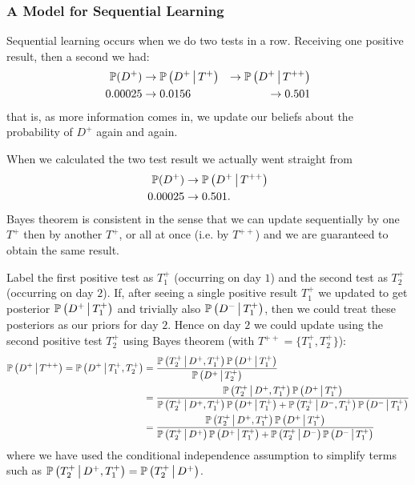 \documentclass[10pt, a4paper]{article}
\begin{document}
\subsubsection{A Model for Sequential Learning}

Sequential learning occurs when we do two tests in a row.
Receiving one positive result,
then a second we had:
\begin{align*}
    \mathbb{P}(D ^ {+}) &\rightarrow \mathbb{P}\left(D ^ {+} \,\middle|\, T ^ {+}\right) &\rightarrow \mathbb{P}\left(D ^ {+} \,\middle|\, T ^ {++}\right) \\
    0.00025 &\rightarrow 0.0156 &\rightarrow 0.501
\end{align*}
that is,
as more information comes in,
we update our beliefs about the probability of $D ^ {+}$ again and again.

When we calculated the two test result we actually went straight from
\begin{align*}
    \mathbb{P}(D ^ {+}) &\rightarrow \mathbb{P}\left(D ^ {+} \,\middle|\, T ^ {++}\right) \\
    0.00025 &\rightarrow 0.501.
\end{align*}
Bayes theorem is consistent in the sense that we can update sequentially by one $T ^ {+}$ then by another $T ^ {+}$,
or all at once
(i.e. by $T ^ {++}$)
and we are guaranteed to obtain the same result.

\begin{example}
    Label the first positive test as $T_1 ^ {+}$
    (occurring on day $1$)
    and the second test as $T_2 ^ {+}$
    (occurring on day $2$).
    If,
    after seeing a single positive result $T_1 ^ {+}$ we updated to get posterior $\mathbb{P}\left(D ^ {+} \,\middle|\, T_1 ^ {+}\right)$ and trivially also $\mathbb{P}\left(D ^ {-} \,\middle|\, T_1 ^ {+}\right)$,
    then we could treat these posteriors as our priors for day $2$.
    Hence on day $2$ we could update using the second positive test $T_2 ^ {+}$ using Bayes theorem
    (with $T ^ {++} = \{T_1 ^ {+}, T_2 ^ {+}\}$):
    \begin{align*}
        \mathbb{P}\left(D ^ {+} \,\middle|\, T ^ {++}\right) = \mathbb{P}\left(D ^ {+} \,\middle|\, T_1 ^ {+}, T_2 ^ {+}\right) &= \frac{\mathbb{P}\left(T_2 ^ {+} \,\middle|\, D ^ {+}, T_1 ^ {+}\right)\mathbb{P}\left(D ^ {+} \,\middle|\, T_1 ^ {+}\right)}{\mathbb{P}\left(D ^ {+} \,\middle|\, T_2 ^ {+}\right)} \\
        &= \frac{\mathbb{P}\left(T_2 ^ {+} \,\middle|\, D ^ {+}, T_1 ^ {+}\right)\mathbb{P}\left(D ^ {+} \,\middle|\, T_1 ^ {+}\right)}{\mathbb{P}\left(T_2 ^ {+} \,\middle|\, D ^ {+}, T_1 ^ {+}\right)\mathbb{P}\left(D ^ {+} \,\middle|\, T_1 ^ {+}\right) + \mathbb{P}\left(T_2 ^ {+} \,\middle|\, D ^ {-}, T_1 ^ {+}\right)\mathbb{P}\left(D ^ {-} \,\middle|\, T_1 ^ {+}\right)} \\
        &= \frac{\mathbb{P}\left(T_2 ^ {+} \,\middle|\, D ^ {+}, T_1 ^ {+}\right)\mathbb{P}\left(D ^ {+} \,\middle|\, T_1 ^ {+}\right)}{\mathbb{P}\left(T_2 ^ {+} \,\middle|\, D ^ {+}\right)\mathbb{P}\left(D ^ {+} \,\middle|\, T_1 ^ {+}\right) + \mathbb{P}\left(T_2 ^ {+} \,\middle|\, D ^ {-}\right)\mathbb{P}\left(D ^ {-} \,\middle|\, T_1 ^ {+}\right)}
    \end{align*}
    where we have used the conditional independence assumption to simplify terms such as $\mathbb{P}\left(T_2 ^ {+} \,\middle|\, D ^ {+}, T_1 ^ {+}\right) = \mathbb{P}\left(T_2 ^ {+} \,\middle|\, D ^ {+}\right)$.
\end{example}
\end{document}

